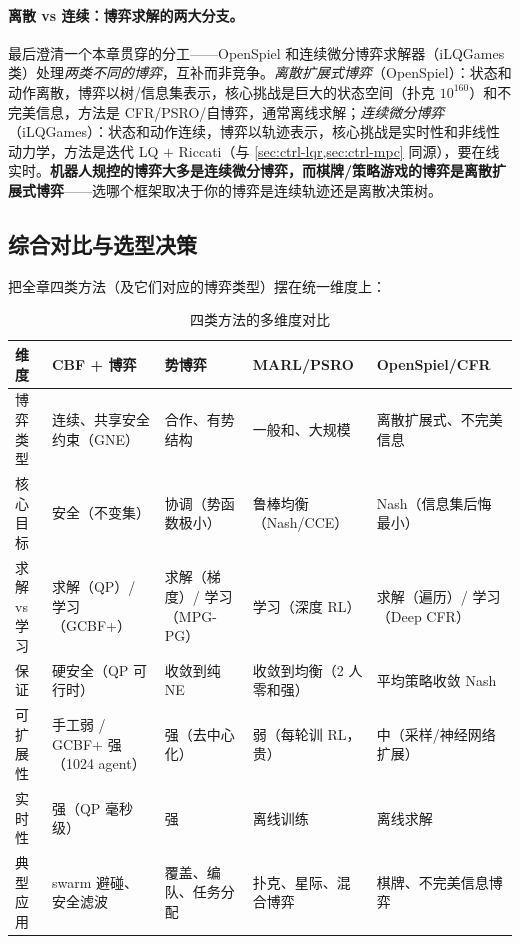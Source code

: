 \paragraph{离散 vs 连续：博弈求解的两大分支。}
最后澄清一个本章贯穿的分工——OpenSpiel 和连续微分博弈求解器（iLQGames 类）处理\emph{两类不同的博弈}，互补而非竞争。\emph{离散扩展式博弈}（OpenSpiel）：状态和动作离散，博弈以树/信息集表示，核心挑战是巨大的状态空间（扑克 $10^{160}$）和不完美信息，方法是 CFR/PSRO/自博弈，通常离线求解；\emph{连续微分博弈}（iLQGames）：状态和动作连续，博弈以轨迹表示，核心挑战是实时性和非线性动力学，方法是迭代 LQ $+$ Riccati（与 \cref{sec:ctrl-lqr,sec:ctrl-mpc} 同源），要在线实时。\textbf{机器人规控的博弈大多是连续微分博弈，而棋牌/策略游戏的博弈是离散扩展式博弈}——选哪个框架取决于你的博弈是连续轨迹还是离散决策树。

\subsection{综合对比与选型决策}
\label{sec:sm-selection}

把全章四类方法（及它们对应的博弈类型）摆在统一维度上：

\begin{table}[H]\centering\small
\caption{四类方法的多维度对比}
\label{tab:sm-four-methods}
\begin{tabular}{p{} p{} p{} p{} p{}}
\toprule
维度 & CBF + 博弈 & 势博弈 & MARL/PSRO & OpenSpiel/CFR \\
\midrule
博弈类型 & 连续、共享安全约束（GNE） & 合作、有势结构 & 一般和、大规模 & 离散扩展式、不完美信息 \\
核心目标 & 安全（不变集） & 协调（势函数极小） & 鲁棒均衡（Nash/CCE） & Nash（信息集后悔最小） \\
求解 vs 学习 & 求解（QP）/ 学习（GCBF+） & 求解（梯度）/ 学习（MPG-PG） & 学习（深度 RL） & 求解（遍历）/ 学习（Deep CFR） \\
保证 & 硬安全（QP 可行时） & 收敛到纯 NE & 收敛到均衡（2 人零和强） & 平均策略收敛 Nash \\
可扩展性 & 手工弱 / GCBF+ 强（1024 agent） & 强（去中心化） & 弱（每轮训 RL，贵） & 中（采样/神经网络扩展） \\
实时性 & 强（QP 毫秒级） & 强 & 离线训练 & 离线求解 \\
典型应用 & swarm 避碰、安全滤波 & 覆盖、编队、任务分配 & 扑克、星际、混合博弈 & 棋牌、不完美信息博弈 \\
\bottomrule
\end{tabular}
\end{table}

